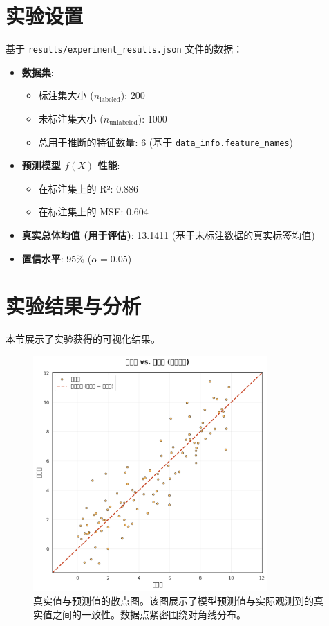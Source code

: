 \documentclass[12pt,a4paper]{article}
\begin{document}
\section{实验设置}
基于 \texttt{results/experiment\_results.json} 文件的数据：
\begin{itemize}
    \item \textbf{数据集}:
    \begin{itemize}
        \item 标注集大小 ($n_{\text{labeled}}$): 200
        \item 未标注集大小 ($n_{\text{unlabeled}}$): 1000
        \item 总用于推断的特征数量: 6 (基于 \texttt{data\_info.feature\_names})
    \end{itemize}
    \item \textbf{预测模型 $f(X)$ 性能}:
    \begin{itemize}
        \item 在标注集上的 R²: 0.886
        \item 在标注集上的 MSE: 0.604
    \end{itemize}
    \item \textbf{真实总体均值 (用于评估)}: 13.1411 (基于未标注数据的真实标签均值)
    \item \textbf{置信水平}: 95\% ($\alpha = 0.05$)
\end{itemize}

\section{实验结果与分析}
\label{sec:results_analysis}

本节展示了实验获得的可视化结果。

\begin{figure}[H] %
    \centering
    \includegraphics[width=0.8\textwidth]{real_vs_predicted_default.png}
    \caption{真实值与预测值的散点图。该图展示了模型预测值与实际观测到的真实值之间的一致性。数据点紧密围绕对角线分布。}
    \label{fig:real_vs_predicted_default}
\end{figure}
\end{document}
